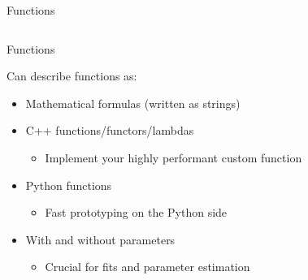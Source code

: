 \documentclass[aspectratio=169]{beamer}
\begin{document}
\begin{frame}{Functions}
\begin{columns}
\begin{column}{0.4\textwidth}

    \end{column}

\end{columns}

\end{frame}

\begin{frame}{Functions}

    Can describe functions as:

    \begin{itemize}
        \item Mathematical formulas (written as strings)
        \item C++ functions/functors/lambdas
              \begin{itemize} \item Implement your highly performant custom function \end{itemize}
        \item Python functions
              \begin{itemize} \item Fast prototyping on the Python side \end{itemize}
        \item With and without parameters
              \begin{itemize} \item Crucial for fits and parameter estimation \end{itemize}
    \end{itemize}


\end{frame}
\end{document}
